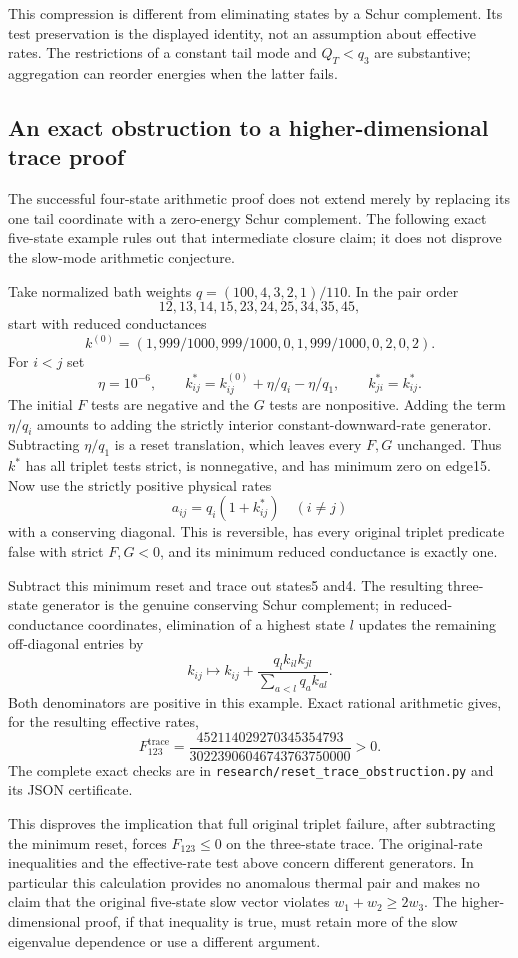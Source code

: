 \documentclass[11pt]{article}
\begin{document}
This compression is different from eliminating states by a Schur
complement. Its test preservation is the displayed identity, not an
assumption about effective rates. The restrictions of a constant tail
mode and $Q_T<q_3$ are substantive; aggregation can reorder energies
when the latter fails.

\subsection{An exact obstruction to a higher-dimensional trace proof}
\label{sec:resettraceobstruction}
The successful four-state arithmetic proof does not extend merely by
replacing its one tail coordinate with a zero-energy Schur complement.
The following exact five-state example rules out that intermediate
closure claim; it does not disprove the slow-mode arithmetic conjecture.

Take normalized bath weights $q=(100,4,3,2,1)/110$.
In the pair order
\[
12,13,14,15,23,24,25,34,35,45,
\]
start with reduced conductances
\[
k^{(0)}=(1,999/1000,999/1000,0,1,999/1000,0,2,0,2).
\]
For $i<j$ set
\[
\eta=10^{-6},\qquad
k^*_{ij}=k^{(0)}_{ij}+\eta/q_i-\eta/q_1,
\qquad k^*_{ji}=k^*_{ij}.
\]
The initial $F$ tests are negative and the $G$ tests are nonpositive.
Adding the term $\eta/q_i$ amounts to adding the strictly interior
constant-downward-rate generator. Subtracting $\eta/q_1$ is a reset
translation, which leaves every $F,G$ unchanged. Thus $k^*$ has all
triplet tests strict, is nonnegative, and has minimum zero on edge15.
Now use the strictly positive physical rates
\[
a_{ij}=q_i(1+k^*_{ij})\quad(i\ne j)
\]
with a conserving diagonal. This is reversible, has every original
triplet predicate false with strict $F,G<0$, and its minimum reduced
conductance is exactly one.

Subtract this minimum reset and trace out states5 and4. The resulting
three-state generator is the genuine conserving Schur complement; in
reduced-conductance coordinates, elimination of a highest state $l$
updates the remaining off-diagonal entries by
\[
k_{ij}\longmapsto k_{ij}
 +\frac{q_l k_{il}k_{jl}}{\sum_{a<l}q_a k_{al}}.
\]
Both denominators are positive in this example. Exact rational arithmetic
gives, for the resulting effective rates,
\[
F^{\mathrm{trace}}_{123}
=\frac{452114029270345354793}{30223906046743763750000}>0.
\]
The complete exact checks are in
\texttt{research/reset\_trace\_obstruction.py} and its JSON certificate.

This disproves the implication that full original triplet failure,
after subtracting the minimum reset, forces $F_{123}\leq0$ on the
three-state trace. The original-rate inequalities and the effective-rate
test above concern different generators. In particular this calculation
provides no anomalous thermal pair and makes no claim that the original
five-state slow vector violates $w_1+w_2\geq2w_3$.
The higher-dimensional proof, if that inequality is true, must retain
more of the slow eigenvalue dependence or use a different argument.
\end{document}
